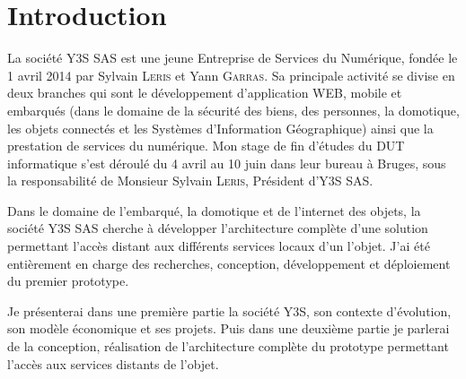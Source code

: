 \chapter*{Introduction}
\label{chap:introduction}

La société Y3S SAS est une jeune Entreprise de Services du Numérique,
fondée le 1\ier{} avril 2014 par Sylvain \textsc{Leris} et Yann
\textsc{Garras}. Sa principale activité se divise en deux branches qui
sont le développement d'application WEB, mobile et embarqués (dans le
domaine de la sécurité des biens, des personnes, la domotique, les
objets connectés et les Systèmes d'Information Géographique) ainsi que
la prestation de services du numérique. Mon stage de fin d'études
du DUT informatique s'est déroulé du 4 avril au 10 juin dans leur
bureau à Bruges, sous la responsabilité de Monsieur Sylvain
\textsc{Leris}, Président d'Y3S SAS.

Dans le domaine de l'embarqué, la domotique et de l'internet des
objets, la société Y3S SAS cherche à développer l'architecture
complète d'une solution permettant l'accès distant aux différents
services locaux d'un l'objet. J'ai été entièrement en charge des
recherches, conception, développement et déploiement du premier
prototype.

Je présenterai dans une première partie la société Y3S, son contexte
d'évolution, son modèle économique et ses projets. Puis dans une
deuxième partie je parlerai de la conception, réalisation de
l'architecture complète du prototype permettant l'accès aux services
distants de l'objet.

